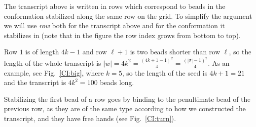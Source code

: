 %	

The transcript above is written in rows which correspond to beads in the conformation stabilized along the same row on the grid. To simplify the argument we will use \textit{row} both for the transcript above and for the conformation it stabilizes in (note that in the figure the row index grows from bottom to top). 

Row $1$ is of length $4k-1$ and row $\ell+1$ is two beads shorter than row $\ell$, so the length of the whole transcript is $|w|=4k^2=\frac{(4k+1-1)^2}{4}=\frac{(|\sigma|-1)^2}{4}$. As an example, see Fig.~\ref{CI:big}, where $k=5$, so the length of the seed is $4k+1=21$ and the transcript is $4k^2 = 100$ beads long.




Stabilizing the first bead of a row goes by binding to the penultimate bead of the previous row, as they are of the same type according to how we constructed the transcript, and they have free hands (see Fig.~\ref{CI:turn}).

